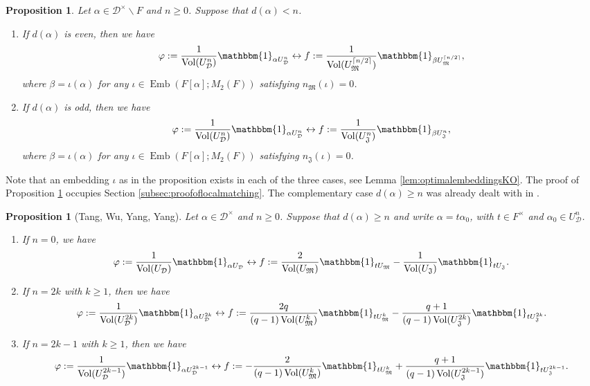 \documentclass{article}
\newtheorem{prop}[lem]{Proposition}
\theoremstyle{named}
\newcommand{\D}{\mathcal{D}}
\newcommand{\M}{\mathfrak{M}}
\newcommand{\J}{\mathfrak{J}}
\DeclareMathOperator{\vol}{Vol}
\DeclareMathOperator{\Emb}{Emb}
\begin{document}
\begin{prop}\label{prop:mymatching}
Let $\alpha \in \D^\times \smallsetminus F$ and $n \geq 0$. Suppose that $d(\alpha)<n$. 
\begin{enumerate}
    \item [i)] If $d(\alpha)$ is even, then we have 
    \begin{equation*}
\varphi := \frac{1}{\vol(U_\D^{n})}\mathbbm{1}_{\alpha U_\D^{n}} \leftrightarrow f := \frac{1}{\vol(U_\M^{\lceil n/2 \rceil})}\mathbbm{1}_{\beta U_\M^{\lceil n/2 \rceil}},
\end{equation*}
where $\beta = \iota(\alpha)$ for any $\iota \in \Emb(F[\alpha]; M_2(F))$ satisfying $n_\M(\iota) = 0$.
    \item [ii)] If $d(\alpha)$ is odd, then we have 
    \begin{equation*}
\varphi := \frac{1}{\vol(U_\D^{n})}\mathbbm{1}_{\alpha U_\D^n} \leftrightarrow f := \frac{1}{\vol(U_\J^{n})}\mathbbm{1}_{\beta U_\J^{n}},
\end{equation*}
where $\beta = \iota(\alpha)$ for any $\iota \in \Emb(F[\alpha]; M_2(F))$ satisfying $n_\J(\iota) = 0$.
\end{enumerate}
\end{prop}

Note that an embedding $\iota$ as in the proposition exists in each of the three cases, see Lemma \ref{lem:optimalembeddingsKO}. The proof of Proposition \ref{prop:mymatching} occupies Section \ref{subsec:proofoflocalmatching}. The complementary case $d(\alpha) \geq n$ was already dealt with in \cite{tang2025}.
\begin{prop}[Tang, Wu, Yang, Yang]\label{prop:matchingtan}
Let $\alpha \in \D^\times$ and $n \geq 0$. Suppose that $d(\alpha) \geq  n$ and write $\alpha = t \alpha_0$, with $t \in F^\times$ and $\alpha_0 \in U_\D^n$.
\begin{enumerate}
    \item [i)] If $n = 0$, we have 
    \begin{equation*}
        \varphi := \frac{1}{\vol(U_\D)}\mathbbm{1}_{\alpha U_\D} \leftrightarrow f := \frac{2}{\vol(U_\M)}\mathbbm{1}_{t U_\M} - \frac{1}{\vol(U_\J)}\mathbbm{1}_{t U_\J}.
    \end{equation*}
    \item [ii)] If $n = 2k$ with $k \geq 1$, then we have 
    \begin{equation*}
        \varphi := \frac{1}{\vol(U_\D^{2k})}\mathbbm{1}_{\alpha U_\D^{2k}} \leftrightarrow f := \frac{2q}{(q - 1)\vol(U_\M^k)}\mathbbm{1}_{t U^k_\M} - \frac{q + 1}{(q - 1)\vol(U^{2k}_\J)}\mathbbm{1}_{t U^{2k}_\J}.
    \end{equation*}
    \item [iii)] If $n = 2k - 1$ with $k \geq 1$, then we have 
    \begin{equation*}
        \varphi := \frac{1}{\vol(U_\D^{2k-1})}\mathbbm{1}_{\alpha U_\D^{2k - 1}} \leftrightarrow f := -\frac{2}{(q - 1)\vol(U_\M^{k})}\mathbbm{1}_{t U^{k}_\M} + \frac{q + 1}{(q - 1)\vol(U^{2k - 1}_\J)}\mathbbm{1}_{t U^{2k-1}_\J}.
    \end{equation*}
\end{enumerate}
\end{prop}
\end{document}
